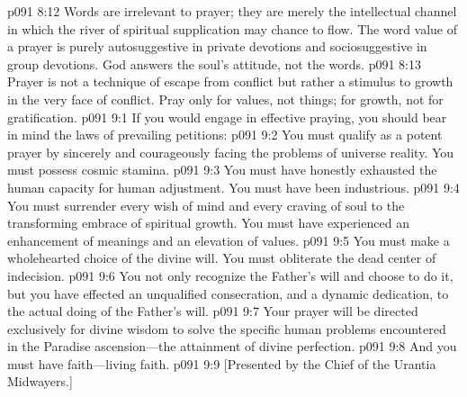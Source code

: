 \vs p091 8:12 Words are irrelevant to prayer; they are merely the intellectual channel in which the river of spiritual supplication may chance to flow. The word value of a prayer is purely autosuggestive in private devotions and sociosuggestive in group devotions. God answers the soul’s attitude, not the words.
\vs p091 8:13 Prayer is not a technique of escape from conflict but rather a stimulus to growth in the very face of conflict. Pray only for values, not things; for growth, not for gratification.
\vs p091 9:1 If you would engage in effective praying, you should bear in mind the laws of prevailing petitions:
\pc \vs p091 9:2 \bibnobreakspace You must qualify as a potent prayer by sincerely and courageously facing the problems of universe reality. You must possess cosmic stamina.
\pc \vs p091 9:3 \bibnobreakspace You must have honestly exhausted the human capacity for human adjustment. You must have been industrious.
\pc \vs p091 9:4 \bibnobreakspace You must surrender every wish of mind and every craving of soul to the transforming embrace of spiritual growth. You must have experienced an enhancement of meanings and an elevation of values.
\pc \vs p091 9:5 \bibnobreakspace You must make a wholehearted choice of the divine will. You must obliterate the dead center of indecision.
\pc \vs p091 9:6 \bibnobreakspace You not only recognize the Father’s will and choose to do it, but you have effected an unqualified consecration, and a dynamic dedication, to the actual doing of the Father’s will.
\pc \vs p091 9:7 \bibnobreakspace Your prayer will be directed exclusively for divine wisdom to solve the specific human problems encountered in the Paradise ascension---the attainment of divine perfection.
\pc \vs p091 9:8 \bibnobreakspace And you must have faith---living faith.
\vsetoff
\vs p091 9:9 [Presented by the Chief of the Urantia Midwayers.]

